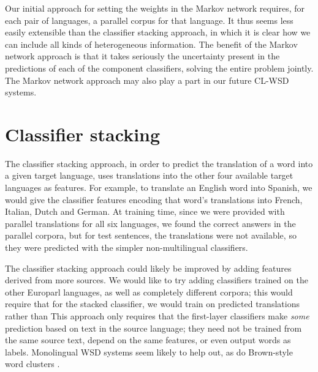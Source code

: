 Our initial approach for setting the weights in the Markov network requires,
for each pair of languages, a parallel corpus for that language. It thus seems
less easily extensible than the classifier stacking approach, in which it is
clear how we can include all kinds of heterogeneous information.
The benefit of the Markov network approach is that it takes seriously the
uncertainty present in the predictions of each of the component classifiers,
solving the entire problem jointly.
The Markov network approach may also play a part in our future CL-WSD systems.


\section{Classifier stacking}
The classifier stacking approach, in order to predict the translation of a word
into a given target language, uses translations into the other four available
target languages as features.
For example, to translate an English word into Spanish, we would give the
classifier features encoding that word's translations into French, Italian,
Dutch and German.
At training time, since we were provided with parallel translations for all six
languages, we found the correct answers in the parallel corpora, but for test
sentences, the translations were not available, so they were predicted with the
simpler non-multilingual classifiers.

The classifier stacking approach could likely be improved by adding features
derived from more sources.
We would like to try adding classifiers trained on the other Europarl
languages, as well as completely different corpora; this would require that for
the stacked classifier, we would train on predicted translations rather than
This approach only requires that the first-layer classifiers make \emph{some}
prediction based on text in the source language;
they need not be trained from the same source text, depend on the same
features, or even output words as labels. Monolingual WSD systems seem likely
to help out, as do Brown-style word clusters \cite{brown1992class}.

